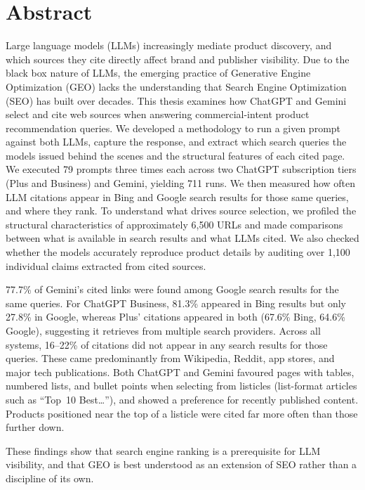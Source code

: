 \chapter{Abstract}

Large language models (LLMs) increasingly mediate product discovery, and which sources they cite directly affect
 brand and publisher visibility. Due to the black box nature of LLMs, the emerging practice of Generative Engine
  Optimization (GEO) lacks the understanding that Search Engine Optimization (SEO) has built over decades.
  This thesis examines how ChatGPT and Gemini select and cite web sources when answering commercial-intent product recommendation queries.
  We developed a methodology to run a given prompt against both LLMs, capture the response, and extract which search
   queries the models issued behind the scenes and the structural features of each cited page.
    We executed 79 prompts three times each across two ChatGPT subscription tiers (Plus and Business) and
    Gemini, yielding 711 runs. We then measured how often LLM citations appear in Bing and Google search
    results for those same queries, and where they rank. To understand what drives source selection, we profiled
 the structural characteristics of approximately 6{,}500 URLs and made comparisons between what is available in search results and what LLMs cited. We also checked whether the models accurately reproduce product details by auditing over 1{,}100 individual claims extracted from cited sources.

77.7\% of Gemini's cited links were found among Google search results for the same queries. For ChatGPT Business, 81.3\% appeared in Bing results but only 27.8\% in Google, whereas Plus' citations appeared in both (67.6\% Bing, 64.6\% Google), suggesting it retrieves from multiple search providers. Across all systems, 16--22\% of citations did not appear in any search results for those queries. These came predominantly from Wikipedia, Reddit, app stores, and major tech publications. Both ChatGPT and Gemini favoured pages with tables, numbered lists, and bullet points when selecting from listicles (list-format articles such as ``Top~10 Best\ldots''), and showed a preference for recently published content. Products positioned near the top of a listicle were cited far more often than those further down.

These findings show that search engine ranking is a prerequisite for LLM visibility, and that GEO is best understood as an extension of SEO rather than a discipline of its own.
